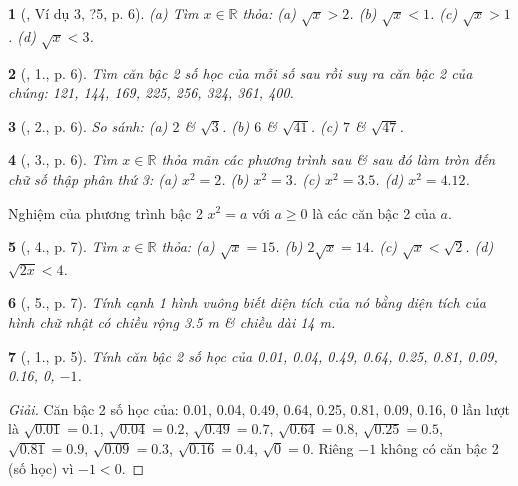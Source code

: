 \documentclass{article}
\newtheorem{baitoan}{}%
\begin{document}
\begin{baitoan}[\cite{SGK_Toan_9_tap_1}, Ví dụ 3, ?5, p. 6]
	(a) Tìm $x\in\mathbb{R}$ thỏa: (a) $\sqrt{x} > 2$. (b) $\sqrt{x} < 1$. (c) $\sqrt{x} > 1$. (d) $\sqrt{x} < 3$.
\end{baitoan}

\begin{baitoan}[\cite{SGK_Toan_9_tap_1}, 1., p. 6]
	Tìm căn bậc 2 số học của mỗi số sau rồi suy ra căn bậc 2 của chúng: \emph{121, 144, 169, 225, 256, 324, 361, 400}.
\end{baitoan}

\begin{baitoan}[\cite{SGK_Toan_9_tap_1}, 2., p. 6]
	So sánh: (a) $2$ \& $\sqrt{3}$. (b) $6$ \& $\sqrt{41}$. (c) $7$ \& $\sqrt{47}$.
\end{baitoan}

\begin{baitoan}[\cite{SGK_Toan_9_tap_1}, 3., p. 6]
	Tìm $x\in\mathbb{R}$ thỏa mãn các phương trình sau \& sau đó làm tròn đến chữ số thập phân thứ 3: (a) $x^2 = 2$. (b) $x^2 = 3$. (c) $x^2 = 3.5$. (d) $x^2 = 4.12$.
\end{baitoan}
 Nghiệm của phương trình bậc 2 $x^2 = a$ với $a\ge0$ là các căn bậc 2 của $a$.

\begin{baitoan}[\cite{SGK_Toan_9_tap_1}, 4., p. 7]
	Tìm $x\in\mathbb{R}$ thỏa: (a) $\sqrt{x} = 15$. (b) $2\sqrt{x} = 14$. (c) $\sqrt{x} < \sqrt{2}$. (d) $\sqrt{2x} < 4$.
\end{baitoan}

\begin{baitoan}[\cite{SGK_Toan_9_tap_1}, 5., p. 7]
	Tính cạnh 1 hình vuông biết diện tích của nó bằng diện tích của hình chữ nhật có chiều rộng \emph{3.5 m} \& chiều dài \emph{14 m}.
\end{baitoan}

\begin{baitoan}[\cite{SBT_Toan_9_tap_1}, 1., p. 5]
	Tính căn bậc 2 số học của \emph{0.01, 0.04, 0.49, 0.64, 0.25, 0.81, 0.09, 0.16, 0, $-1$.}
\end{baitoan}

\begin{proof}[Giải]
	Căn bậc 2 số học của: 0.01, 0.04, 0.49, 0.64, 0.25, 0.81, 0.09, 0.16, 0 lần lượt là $\sqrt{0.01} = 0.1$, $\sqrt{0.04} = 0.2$, $\sqrt{0.49} = 0.7$, $\sqrt{0.64} = 0.8$, $\sqrt{0.25} = 0.5$, $\sqrt{0.81} = 0.9$, $\sqrt{0.09} = 0.3$, $\sqrt{0.16} = 0.4$, $\sqrt{0} = 0$. Riêng $-1$ không có căn bậc 2 (số học) vì $-1 < 0$.
\end{proof}
\end{document}
